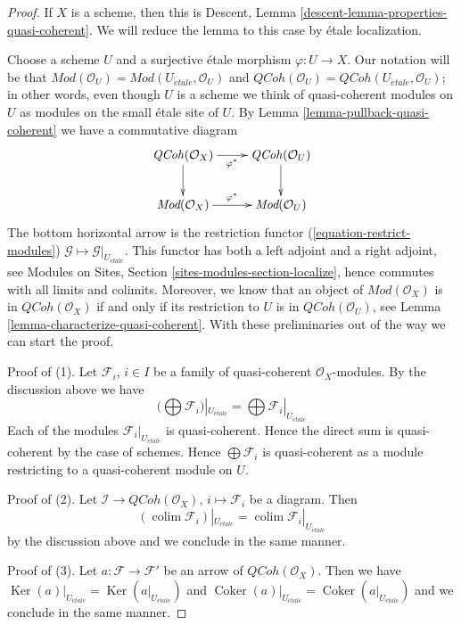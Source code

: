 \documentclass[10pt,a4paper]{amsart}
\theoremstyle{plain}
\theoremstyle{definition}
\theoremstyle{remark}
\numberwithin{equation}{subsection}
\def\colim{\mathop{\mathrm{colim}}\nolimits}
\def\etale{{\acute{e}tale}}
\def\QCoh{\mathit{QCoh}}
\def\Ker{\mathop{\mathrm{Ker}}}
\def\Coker{\mathop{\mathrm{Coker}}}
\begin{document}
\begin{proof}
If $X$ is a scheme, then this is
Descent, Lemma \ref{descent-lemma-properties-quasi-coherent}.
We will reduce the lemma to this case by \'etale localization.

\medskip\noindent
Choose a scheme $U$ and a surjective \'etale morphism $\varphi : U \to X$.
Our notation will be that $\textit{Mod}(\mathcal{O}_U) =
\textit{Mod}(U_\etale, \mathcal{O}_U)$ and
$\QCoh(\mathcal{O}_U) = \QCoh(U_\etale, \mathcal{O}_U)$; in other
words, even though $U$ is a scheme we think of quasi-coherent
modules on $U$ as modules on the small \'etale site of $U$.
By Lemma \ref{lemma-pullback-quasi-coherent} we have a commutative diagram
$$
\xymatrix{
\QCoh(\mathcal{O}_X) \ar[r]_{\varphi^*} \ar[d] &
\QCoh(\mathcal{O}_U) \ar[d] \\
\textit{Mod}(\mathcal{O}_X) \ar[r]^{\varphi^*} &
\textit{Mod}(\mathcal{O}_U)
}
$$
The bottom horizontal arrow is the restriction functor
(\ref{equation-restrict-modules})
$\mathcal{G} \mapsto \mathcal{G}|_{U_\etale}$.
This functor has both a left adjoint and a right adjoint, see
Modules on Sites, Section \ref{sites-modules-section-localize},
hence commutes with all limits and colimits.
Moreover, we know that an object of $\textit{Mod}(\mathcal{O}_X)$ is in
$\QCoh(\mathcal{O}_X)$ if and only if its restriction to $U$ is in
$\QCoh(\mathcal{O}_U)$, see
Lemma \ref{lemma-characterize-quasi-coherent}.
With these preliminaries out of the way we can start the proof.

\medskip\noindent
Proof of (1). Let $\mathcal{F}_i$, $i \in I$ be a family of quasi-coherent
$\mathcal{O}_X$-modules. By the discussion above we have
$$
\Big(\bigoplus \mathcal{F}_i\Big)|_{U_\etale} =
\bigoplus \mathcal{F}_i|_{U_\etale}
$$
Each of the modules $\mathcal{F}_i|_{U_\etale}$ is quasi-coherent.
Hence the direct sum is quasi-coherent by the case of schemes.
Hence $\bigoplus \mathcal{F}_i$ is quasi-coherent as a module
restricting to a quasi-coherent module on $U$.

\medskip\noindent
Proof of (2). Let $\mathcal{I} \to \QCoh(\mathcal{O}_X)$,
$i \mapsto \mathcal{F}_i$ be a diagram. Then
$$
(\colim \mathcal{F}_i)|_{U_\etale} = \colim \mathcal{F}_i|_{U_\etale}
$$
by the discussion above and we conclude in the same manner.

\medskip\noindent
Proof of (3). Let $a : \mathcal{F} \to \mathcal{F}'$
be an arrow of $\QCoh(\mathcal{O}_X)$. Then
we have $\Ker(a)|_{U_\etale} = \Ker(a|_{U_\etale})$
and $\Coker(a)|_{U_\etale} = \Coker(a|_{U_\etale})$
and we conclude in the same manner.


\end{proof}
\end{document}
